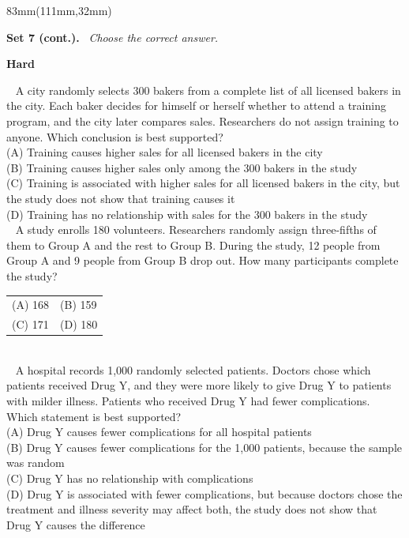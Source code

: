 \documentclass[a4paper]{article}
\makeatletter
\newcommand{\RCOL}{111mm}
\newcommand{\COLW}{83mm}
\newcommand{\setkicker}[2]{%
{\sffamily\bfseries\fontsize{12}{14}\selectfont #1.}\ {\itshape\fontsize{11}{14}\selectfont\color{black!75} #2}\par\vspace{2mm}%
}
\newcommand{\pnum}[1]{\fcolorbox{ink}{white}{\sffamily\bfseries\fontsize{8}{8}\selectfont #1}~}
\newcommand{\satq}[6]{%
\noindent\pnum{#1} #2\\[2mm]
\hspace*{7mm}\begin{tabular}{@{}p{32mm}p{32mm}@{}}
(A) #3 & (B) #4 \\[2.5mm]
(C) #5 & (D) #6 \\
\end{tabular}\\[7mm]%
}
\newcommand{\satqw}[6]{%
\noindent\pnum{#1} #2\\[2mm]
\hspace*{7mm}(A) #3\\[1.6mm]
\hspace*{7mm}(B) #4\\[1.6mm]
\hspace*{7mm}(C) #5\\[1.6mm]
\hspace*{7mm}(D) #6\\[7mm]%
}
\makeatother
\begin{document}
\begin{textblock*}{\COLW}(\RCOL,32mm)
{\fontsize{10.3}{13}\selectfont
\setkicker{Set 7 (cont.)}{Choose the correct answer.}
{\sffamily\bfseries\color{accent}\fontsize{10.5}{12}\selectfont Hard}\par\vspace{1.5mm}
\satqw{1}{A city randomly selects 300 bakers from a complete list of all licensed bakers in the city. Each baker decides for himself or herself whether to attend a training program, and the city later compares sales. Researchers do not assign training to anyone. Which conclusion is best supported?}{Training causes higher sales for all licensed bakers in the city}{Training causes higher sales only among the 300 bakers in the study}{Training is associated with higher sales for all licensed bakers in the city, but the study does not show that training causes it}{Training has no relationship with sales for the 300 bakers in the study}
\satq{2}{A study enrolls 180 volunteers. Researchers randomly assign three-fifths of them to Group A and the rest to Group B. During the study, 12 people from Group A and 9 people from Group B drop out. How many participants complete the study?}{168}{159}{171}{180}
\satqw{3}{A hospital records 1,000 randomly selected patients. Doctors chose which patients received Drug Y, and they were more likely to give Drug Y to patients with milder illness. Patients who received Drug Y had fewer complications. Which statement is best supported?}{Drug Y causes fewer complications for all hospital patients}{Drug Y causes fewer complications for the 1,000 patients, because the sample was random}{Drug Y has no relationship with complications}{Drug Y is associated with fewer complications, but because doctors chose the treatment and illness severity may affect both, the study does not show that Drug Y causes the difference}
}
\end{textblock*}
\clearpage
\end{document}
